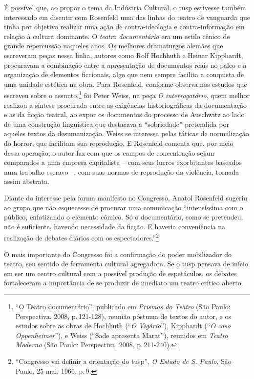É possível que, ao propor o tema da Indústria Cultural, o {\sc tusp} estivesse
também interessado em discutir com Rosenfeld uma das linhas do teatro de
vanguarda que tinha por objetivo realizar uma ação de contra-ideologia e
contra-informação em relação à cultura dominante. O {\it teatro
documentário} era um estilo cênico de grande repercussão naqueles anos.
Os melhores dramaturgos alemães que escreveram peças nessa linha,
autores como Rolf Hochhuth e Heinar Kipphardt, procuravam a combinação
entre a apresentação de documentos reais no palco e a organização de
elementos ficcionais, algo que nem sempre facilita a conquista de uma
unidade estética na obra. Para Rosenfeld, conforme observa nos estudos
que escreveu sobre o assunto,\footnote{“O Teatro documentário”,
  publicado em {\it Prismas do Teatro} (São Paulo: Perspectiva, 2008, p.\,121-128), reunião póstuma de textos do autor, e os estudos sobre as
  obras de Hochhuth (“{\it O Vigário}”), Kipphardt (“{\it O caso
  Oppenheimer}”), e Weiss (“Sade apresenta Marat”), reunidos em
  {\it Teatro Moderno} (São Paulo: Perspectiva, 2008, p.\,211-240).} foi
Peter Weiss, na peça {\it O interrogatório}, quem melhor realizou a
síntese procurada entre as exigências historiográficas da documentação e
as da ficção teatral, ao expor os documentos do processo de Auschwitz ao
lado de uma construção linguística que destacava a “sobriedade”
pretendida por aqueles textos da desumanização. Weiss se interessa pelas
táticas de normalização do horror, que facilitam sua reprodução. E
Rosenfeld comenta que, por meio dessa operação, o autor faz com que os
campos de concentração sejam comparados a uma empresa capitalista -- com
seus lucros exorbitantes baseados num trabalho escravo --, com suas
normas de reprodução da violência, tornada assim abstrata.

Diante do interesse pela forma manifesto no Congresso, Anatol Rosenfeld
sugeriu ao grupo que não esquecesse de procurar uma comunicação
“intensíssima com o público, enfatizando o elemento cômico. Só o
documentário, como se pretendeu, não é suficiente, havendo necessidade
da ficção. E haveria conveniência na realização de debates diários com
os espectadores.”\footnote{“Congresso vai definir a orientação do {\sc tusp}”,
  {\it O Estado de S. Paulo}, São Paulo, 25 mai. 1966, p.\,9.}

O mais importante do Congresso foi a confirmação do poder mobilizador do
teatro, seu sentido de ferramenta cultural agregadora. Se o {\sc tusp} pensava
de início em ser um centro cultural com a possível produção de
espetáculos, os debates fortaleceram a importância de se produzir de
imediato um teatro crítico aberto.

